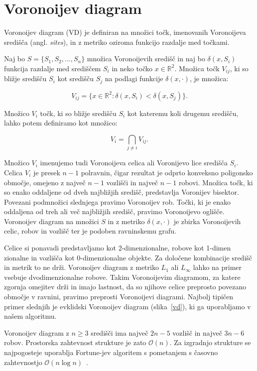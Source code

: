 \documentclass[a4paper, 12pt]{book}
\newcommand{\OO}{\ensuremath{\mathcal{O}}} %
\begin{document}
\section{Voronoijev diagram}
Voronoijev diagram (VD) je definiran na množici točk, imenovanih Voronoijeva središča (angl. \textit{sites}), in z metriko oziroma funkcijo razdalje med točkami.

Naj bo $S = \{S_1,S_2,...,S_n\}$ množica Voronoijevih središč in naj bo $\delta(x,S_i)$ funkcija razdalje med središčem $S_i$ in neko točko $x \in \mathbb{R}^2$. Množica točk $V_{ij}$, ki so bližje središču $S_i$ kot središču $S_j$ na podlagi funkcije $\delta(x,\cdot)$, je množica:

\begin{equation*}
V_{ij} = \{x \in \mathbb{R}^2: \delta(x,S_i) < \delta(x,S_j)\}. 
\end{equation*}

Množico $V_i$ točk, ki so bližje središču $S_i$ kot kateremu koli drugemu središču, lahko potem definiramo kot množico:

\begin{equation*}
V_i = \bigcap_{j \neq i} V_{ij} .
\end{equation*}

Množico $V_i$ imenujemo tudi Voronoijeva celica ali Voronijevo lice središča $S_i$. Celica $V_i$ je presek $n-1$ polravnin, čigar rezultat je odprto konveksno poligonsko območje, omejeno z največ $n-1$ vozlišči in največ $n-1$ robovi. Množica točk, ki so enako oddaljene od dveh najbližjih središč, predstavlja Voronijev bisektor. Povezani podmnožici slednjega pravimo Voronoijev rob. Točki, ki je enako oddaljena od treh ali več najbližjih središč, pravimo Voronoijevo oglišče. Voronoijev diagram na množici $S$ in z metriko $\delta(x,\cdot)$ je zbirka Voronoijevih celic, robov in vozlišč ter je podoben ravninskemu grafu.

Celice si ponavadi predstavljamo kot 2-dimenzionalne, robove kot 1-dimen\- zionalne in vozlišča kot 0-dimenzionalne objekte. Za določene kombinacije središč in metrik to ne drži. Voronoijev diagram z metriko $L_1$ ali $L_{\infty}$ lahko na primer vsebuje dvodimenzionalne robove. Takim Voronoijevim diagramom, za katere zgornja omejitev drži in imajo lastnost, da so njihove celice preprosto povezano območje v ravnini, pravimo preprosti Voronoijevi diagrami. Najbolj tipičen primer slednjih je evklidski Voronoijev diagram (slika~\ref{vd}), ki ga uporabljamo v našem algoritmu.

Voronoijev diagram z $n\geq 3$ središči ima največ $2n - 5$ vozlišč in največ $3n-6$ robov. Prostorska zahtevnost strukture je zato $\OO(n)$. Za izgradnjo strukture se najpogosteje uporablja Fortune-jev algoritem s pometanjem s časovno zahtevnostjo $\OO(n\log n)$~\cite[poglavji 7.1 in 7.2]{bkos-08-all}.
\end{document}
